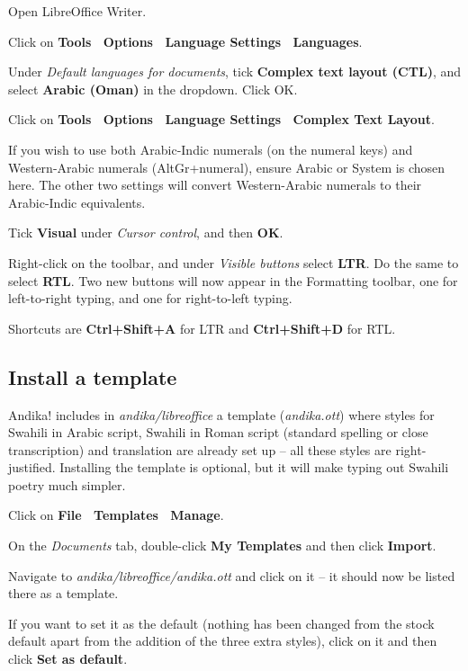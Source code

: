 Open LibreOffice Writer.

Click on \textbf{Tools \textrightarrow\ Options \textrightarrow\ Language Settings \textrightarrow\ Languages}.

Under \textit{Default languages for documents}, tick \textbf{Complex text layout (CTL)}, and select \textbf{Arabic (Oman)} in the dropdown.  Click OK.

Click on \textbf{Tools \textrightarrow\ Options \textrightarrow\ Language Settings \textrightarrow\ Complex Text Layout}.

If you wish to use both Arabic-Indic numerals (on the numeral keys) and Western-Arabic numerals (AltGr+numeral), ensure Arabic or System is chosen here. The other two settings will convert Western-Arabic numerals to their Arabic-Indic equivalents.

Tick \textbf{Visual} under \textit{Cursor control}, and then \textbf{OK}.

Right-click on the toolbar, and under \textit{Visible buttons} select \textbf{LTR}.  Do the same to select \textbf{RTL}.  Two new buttons will now appear in the Formatting toolbar, one for left-to-right typing, and one for right-to-left typing.

Shortcuts are \textbf{Ctrl+Shift+A} for LTR and \textbf{Ctrl+Shift+D} for RTL.

\subsection{Install a template}

Andika! includes in \textit{andika/libreoffice} a template (\textit{andika.ott}) where styles for Swahili in Arabic script, Swahili in Roman script (standard spelling or close transcription) and translation are already set up -- all these styles are right-justified.  Installing the template is optional, but it will make typing out Swahili poetry much simpler.

Click on \textbf{File \textrightarrow\ Templates \textrightarrow\ Manage}.

On the \textit{Documents} tab, double-click \textbf{My Templates} and then click \textbf{Import}.

Navigate to \textit{andika/libreoffice/andika.ott} and click on it -- it should now be listed there as a template.

If you want to set it as the default (nothing has been changed from the stock default apart from the addition of the three extra styles), click on it and then click \textbf{Set as default}.


